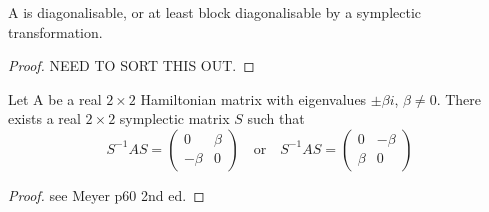 \begin{lemma} A is diagonalisable, or at least block diagonalisable by a symplectic transformation.
\end{lemma}
\begin{proof}
NEED TO SORT THIS OUT.
\end{proof}

\begin{lemma} Let A be a real $2 \times 2$ Hamiltonian matrix with eigenvalues $\pm \beta i$, $\beta \neq 0$. There exists a real $2 \times 2$ symplectic matrix $S$ such that
\begin{equation}
S^{-1}AS = \begin{pmatrix} 0 & \beta \\ -\beta & 0 \end{pmatrix} \quad \text{or} \quad S^{-1}AS = \begin{pmatrix} 0 & -\beta \\ \beta & 0 \end{pmatrix}
\end{equation}
\label{lem:reala} \end{lemma}
\begin{proof}
see Meyer p60 2nd ed.
\end{proof}

